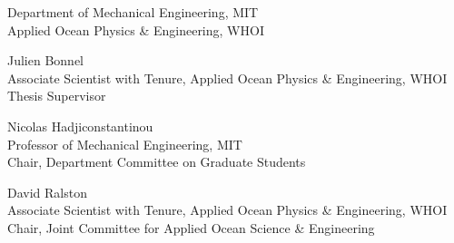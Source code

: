\begin{titlepage}
\begin{center}
\begin{singlespace}
    \signature{Author}{\small Department of Mechanical Engineering, MIT \\ Applied Ocean Physics \& Engineering, WHOI \\ \@date}
    \vspace{1em}
    \signature{Certified by}{Julien Bonnel \\ \small Associate Scientist with Tenure, Applied Ocean Physics \& Engineering, WHOI \\ Thesis Supervisor}
    \vspace{1em}
    \signature{Accepted by}{Nicolas Hadjiconstantinou \\ \small Professor of Mechanical Engineering, MIT \\ Chair, Department Committee on Graduate Students}
    \vspace{1em}
    \signature{Accepted by}{David Ralston \\ \small Associate Scientist with Tenure, Applied Ocean Physics \& Engineering, WHOI \\ Chair, Joint Committee for Applied Ocean Science \& Engineering}
    \end{singlespace}
  \end{center}
  \makeatother
\end{titlepage}

\newpage
\null
\newpage